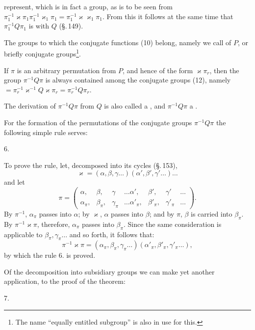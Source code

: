 
represent, which is in fact a group, as is to be seen from $\pi_1^{-1}\varkappa\pi_1\pi_1^{-1}\varkappa_1\pi_1 = \pi_1^{-1}\varkappa\varkappa_1\pi_1$. From this it follows at the same time that $\pi_1^{-1}Q\pi_1$ is  with $Q$ (\S.\,149).

The groups to which the conjugate functions (10) belong, namely
we call  of $P$, or briefly conjugate groups\footnote{The name ``equally entitled subgroup'' is also in use for this.}.

If $\pi$ is an arbitrary permutation from $P$, and hence of the form $\varkappa\pi_r$, then the group $\pi^{-1}Q\pi$ is always contained among the conjugate groups (12), namely $= \pi_r^{-1}\varkappa^{-1}Q\varkappa\pi_r = \pi_r^{-1}Q\pi_r$.

The derivation of $\pi^{-1}Q\pi$ from $Q$ is also called a , and $\pi^{-1}Q\pi$ a .

For the formation of the permutations of the conjugate groups $\pi^{-1}Q\pi$ the following simple rule serves:

6. 

To prove the rule, let, decomposed into its cycles (\S.\,153),
\[
\varkappa = (\alpha,\beta,\gamma\ldots)(\alpha',\beta',\gamma'\ldots)\ldots
\]
and let
\[
\pi =
\begin{pmatrix}
\alpha, & \beta, & \gamma & \ldots \alpha', & \beta', & \gamma' & \ldots \\
\alpha_\pi, & \beta_\pi, & \gamma_\pi & \ldots \alpha'_\pi, & \beta'_\pi, & \gamma'_\pi & \ldots
\end{pmatrix}.
\]
By $\pi^{-1}$, $\alpha_\pi$ passes into $\alpha$; by $\varkappa$, $\alpha$ passes into $\beta$; and by $\pi$, $\beta$ is carried into $\beta_\pi$. By $\pi^{-1}\varkappa\pi$, therefore, $\alpha_\pi$ passes into $\beta_\pi$. Since the same consideration is applicable to $\beta_\pi, \gamma_\pi\ldots$ and so forth, it follows that:
\[
\pi^{-1}\varkappa\pi = (\alpha_\pi,\beta_\pi,\gamma_\pi\ldots)(\alpha'_\pi,\beta'_\pi,\gamma'_\pi\ldots),
\]
by which the rule 6. is proved.

Of the decomposition into subsidiary groups we can make yet another application, to the proof of the theorem:

7. 
